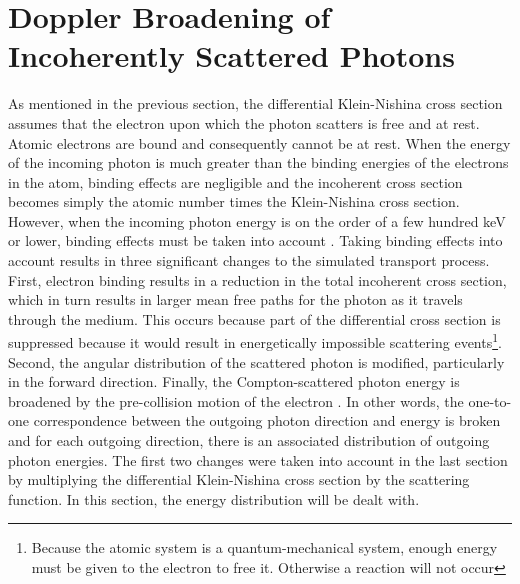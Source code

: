 \section{Doppler Broadening of Incoherently Scattered Photons}
\label{sec:photon_dopp_broadening}
As mentioned in the previous section, the differential Klein-Nishina cross 
section assumes that the electron upon which the photon scatters is free
and at rest. Atomic electrons are bound and consequently cannot be at rest. 
When the energy of the incoming photon is much greater than the binding 
energies of the electrons in the atom, binding effects are negligible and the
incoherent cross section becomes simply the atomic number times the 
Klein-Nishina cross section. However, when the incoming photon energy is on the
order of a few hundred keV or lower, binding effects must be taken into account
\citep{namito_implementation_1994}. Taking binding effects into account results
in three significant changes to the simulated transport process. First, electron
binding results in a reduction in the total incoherent cross section, which
in turn results in larger mean free paths for the photon as it travels through
the medium. This occurs because part of the differential cross section is
suppressed because it would result in energetically impossible scattering 
events\footnote{Because the atomic system is a quantum-mechanical system, enough
energy must be given to the electron to free it. Otherwise a reaction will not
occur}. Second, the angular distribution of the scattered photon is 
modified, particularly in the forward direction. Finally, the Compton-scattered
photon energy is broadened by the pre-collision motion of the electron 
\citep{namito_implementation_1994}. In other words, the one-to-one 
correspondence between the outgoing photon direction and energy is broken and 
for each outgoing direction, there is an associated distribution of outgoing 
photon energies. The first two changes were taken into account in the last
section by multiplying the differential Klein-Nishina cross section by the 
scattering function. In this section, the energy distribution will be dealt
with. 

